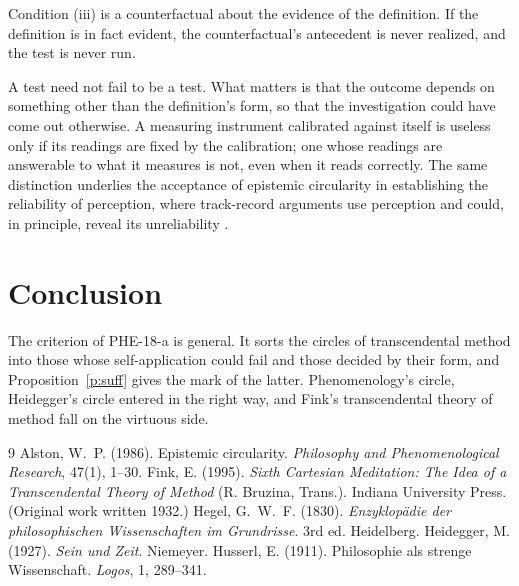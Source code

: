 \documentclass{situationist-preprint}
\begin{document}
\begin{objection}
Condition (iii) is a counterfactual about the evidence of the definition. If the definition is in fact evident, the counterfactual's antecedent is never realized, and the test is never run.
\end{objection}

\begin{reply}
A test need not fail to be a test. What matters is that the outcome depends on something other than the definition's form, so that the investigation could have come out otherwise. A measuring instrument calibrated against itself is useless only if its readings are fixed by the calibration; one whose readings are answerable to what it measures is not, even when it reads correctly. The same distinction underlies the acceptance of epistemic circularity in establishing the reliability of perception, where track-record arguments use perception and could, in principle, reveal its unreliability \citep{Alston1986}.
\end{reply}

\section{Conclusion}

The criterion of PHE-18-a is general. It sorts the circles of transcendental method into those whose self-application could fail and those decided by their form, and Proposition~\ref{p:suff} gives the mark of the latter. Phenomenology's circle, Heidegger's circle entered in the right way, and Fink's transcendental theory of method fall on the virtuous side.

\begin{thebibliography}{9}\small
{} Alston, W.~P. (1986). Epistemic circularity. \emph{Philosophy and Phenomenological Research}, 47(1), 1--30.
 Fink, E. (1995). \emph{Sixth Cartesian Meditation: The Idea of a Transcendental Theory of Method} (R. Bruzina, Trans.). Indiana University Press. (Original work written 1932.)
 Hegel, G.~W.~F. (1830). \emph{Enzyklop\"adie der philosophischen Wissenschaften im Grundrisse}. 3rd ed. Heidelberg.
 Heidegger, M. (1927). \emph{Sein und Zeit}. Niemeyer.
 Husserl, E. (1911). Philosophie als strenge Wissenschaft. \emph{Logos}, 1, 289--341.
\end{thebibliography}
\end{document}
